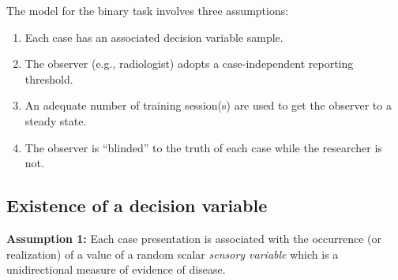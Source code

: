 \documentclass[
]{book}
\begin{document}
The model for the binary task involves three assumptions:

\begin{enumerate}
\def\labelenumi{\arabic{enumi}.}
\item
  Each case has an associated decision variable sample.
\item
  The observer (e.g., radiologist) adopts a case-independent reporting threshold.
\item
  An adequate number of training session(s) are used to get the observer to a steady state.
\item
  The observer is ``blinded'' to the truth of each case while the researcher is not.
\end{enumerate}

\hypertarget{existence-of-a-decision-variable}{%
\subsection{Existence of a decision variable}\label{existence-of-a-decision-variable}}

\textbf{Assumption 1:} Each case presentation is associated with the occurrence (or realization) of a value of a random scalar \emph{sensory variable} which is a unidirectional measure of evidence of disease.
\end{document}
